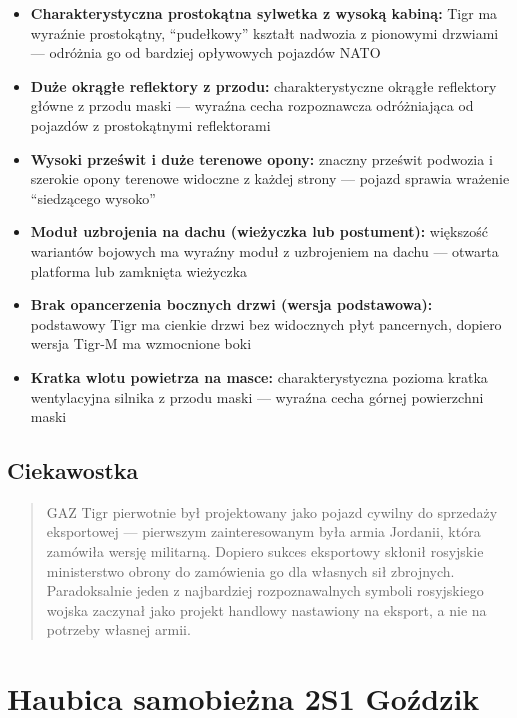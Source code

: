 \documentclass[12pt,openany,oneside]{book}
\providecommand{\tightlist}{%
  \setlength{\itemsep}{0pt}\setlength{\parskip}{0pt}}
\begin{document}
\begin{itemize}
\tightlist
\item
  \textbf{Charakterystyczna prostokątna sylwetka z wysoką kabiną:} Tigr
  ma wyraźnie prostokątny, ``pudełkowy'' kształt nadwozia z pionowymi
  drzwiami --- odróżnia go od bardziej opływowych pojazdów NATO
\item
  \textbf{Duże okrągłe reflektory z przodu:} charakterystyczne okrągłe
  reflektory główne z przodu maski --- wyraźna cecha rozpoznawcza
  odróżniająca od pojazdów z prostokątnymi reflektorami
\item
  \textbf{Wysoki prześwit i duże terenowe opony:} znaczny prześwit
  podwozia i szerokie opony terenowe widoczne z każdej strony --- pojazd
  sprawia wrażenie ``siedzącego wysoko''
\item
  \textbf{Moduł uzbrojenia na dachu (wieżyczka lub postument):}
  większość wariantów bojowych ma wyraźny moduł z uzbrojeniem na dachu
  --- otwarta platforma lub zamknięta wieżyczka
\item
  \textbf{Brak opancerzenia bocznych drzwi (wersja podstawowa):}
  podstawowy Tigr ma cienkie drzwi bez widocznych płyt pancernych,
  dopiero wersja Tigr-M ma wzmocnione boki
\item
  \textbf{Kratka wlotu powietrza na masce:} charakterystyczna pozioma
  kratka wentylacyjna silnika z przodu maski --- wyraźna cecha górnej
  powierzchni maski
\end{itemize}

\section{Ciekawostka}\label{ciekawostka-8}

\begin{quote}
GAZ Tigr pierwotnie był projektowany jako pojazd cywilny do sprzedaży
eksportowej --- pierwszym zainteresowanym była armia Jordanii, która
zamówiła wersję militarną. Dopiero sukces eksportowy skłonił rosyjskie
ministerstwo obrony do zamówienia go dla własnych sił zbrojnych.
Paradoksalnie jeden z najbardziej rozpoznawalnych symboli rosyjskiego
wojska zaczynał jako projekt handlowy nastawiony na eksport, a nie na
potrzeby własnej armii.
\end{quote}

\chapter{Haubica samobieżna 2S1
Goździk}\label{haubica-samobieux17cna-2s1-goux17adzik}
\end{document}
